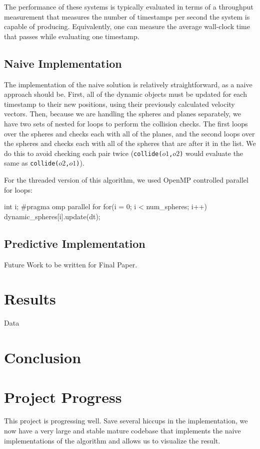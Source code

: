\documentclass[conference]{IEEEtran}
\begin{document}
The performance of these systems is typically evaluated in terms of a throughput measurement that measures the number of timestamps per second the system is capable of producing.  Equivalently, one can measure the average wall-clock time that passes while evaluating one timestamp.

\subsection{Naive Implementation}

The implementation of the naive solution is relatively straightforward, as a naive approach should be.  First, all of the dynamic objects must be updated for each timestamp to their new positions, using their previously calculated velocity vectors.  Then, because we are handling the spheres and planes separately, we have two sets of nested for loops to perform the collision checks.  The first loops over the spheres and checks each with all of the planes, and the second loops over the spheres and checks each with all of the spheres that are after it in the list.  We do this to avoid checking each pair twice (\texttt{collide($o1$,$o2$)} would evaluate the same as \texttt{collide($o2$,$o1$)}).

For the threaded version of this algorithm, we used OpenMP controlled parallel for loops:
\begin{verbatimtab}[3]
	int i;
	#pragma omp parallel for
	for(i = 0; i < num_spheres; i++)
	{
		dynamic_spheres[i].update(dt);
	}
\end{verbatimtab}

\subsection{Predictive Implementation}
Future Work to be written for Final Paper.
\section{Results} %
Data
\section{Conclusion} 

\appendix %
\section{Project Progress}
This project is progressing well.  Save several hiccups in the implementation, we now have a very large and stable mature codebase that implements the naive implementations of the algorithm and allows
us to visualize the result.
\end{document}

